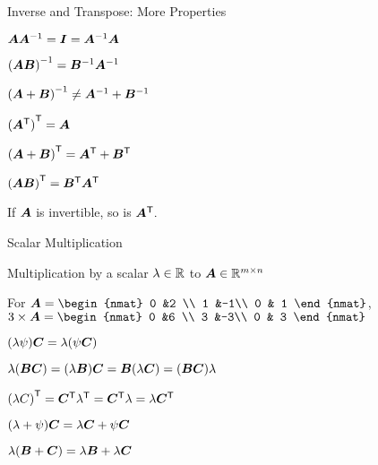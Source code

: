 \documentclass[handout,fleqn,aspectratio=169]{beamer}
\begin{document}
\begin{frame}{Inverse and Transpose: More Properties}

\plitemsep 0.2in
\bci 
\item $\bm{A}{{\bm{A}}^{-1}} = \bm{I} = {{\bm{A}}^{-1}}\bm{A}$

\item ${{(\bm{AB})}^{-1}} = {{\bm{B}}^{-1}} {{\bm{A}}^{-1}}$

\item ${{(\bm{A} + \bm{B})}^{-1}} \neq {{\bm{A}}^{-1}} + {{\bm{B}}^{-1}}$

\item ${({\bm{A}}^{\mathsf{T}})}^{\mathsf{T}} = \bm{A}$  

\item ${(\bm{A} + \bm{B})}^{\mathsf{T}} = {\bm{A}}^{\mathsf{T}} + {\bm{B}}^{\mathsf{T}}$

\item ${(\bm{A}\bm{B})}^{\mathsf{T}} = {\bm{B}}^{\mathsf{T}}{\bm{A}}^{\mathsf{T}}$

\item If $\bm{A}$ is invertible, so is ${\bm{A}}^{\mathsf{T}}.$
\eci

\end{frame}

\begin{frame}{Scalar Multiplication}

\plitemsep 0.1in
\bci 
    \item Multiplication by a scalar $\lambda \in {\mathbb R}$ to $\bm{A} \in {\mathbb R}^{m \times n}$
    \item \exam For 
$\mat{A} = 
\begin{nmat} 
 0 &2 \\
 1  &-1\\
 0  & 1
\end{nmat}
$,
$
3 \times \mA = \begin{nmat} 
 0 &6 \\
 3  &-3\\
 0  & 3
\end{nmat}
$

\bigskip

\item {}
\bci
\item $(\lambda \psi) \bm{C} = \lambda (\psi \bm{C})$
\item $\lambda(\bm{B} \bm{C}) = (\lambda \bm{B}) \bm{C} = \bm{B} (\lambda \bm{C}) = (\bm{B} \bm{C}) \lambda$
\item ${(\lambda C)}^{\mathsf{T}} = {\bm{C}}^{\mathsf{T}} {\lambda}^{\mathsf{T}} = {\bm{C}}^{\mathsf{T}} \lambda = \lambda {\bm{C}}^{\mathsf{T}}$
\eci

\item {}
\bci
\item $(\lambda + \psi) \bm{C} = \lambda \bm{C} + \psi \bm{C}$
\item $\lambda(\bm{B} + \bm{C}) = \lambda \bm{B} + \lambda \bm{C}$
\eci


\eci

\end{frame}
\end{document}
